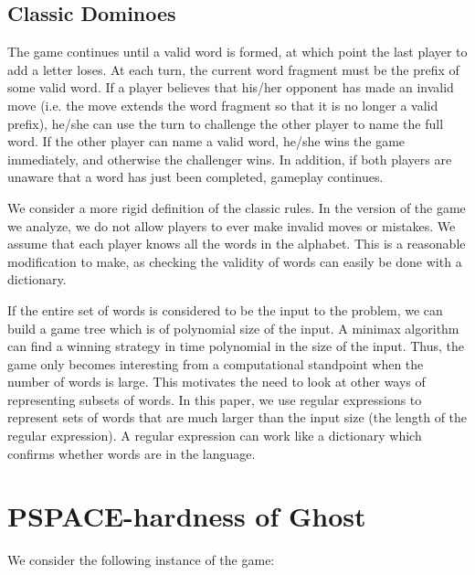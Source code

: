 \documentclass[runningheads,a4paper]{llncs}
\begin{document}
\subsection{Classic Dominoes}

The game continues until a valid word is formed, at which point the last player to add a letter loses. At each turn, the current word fragment must be the prefix of some valid word. If a player believes that his/her opponent has made an invalid move (i.e. the move extends the word fragment so that it is no longer a valid prefix), he/she can use the turn to challenge the other player to name the full word. If the other player can name a valid word, he/she wins the game immediately, and otherwise the challenger wins. In addition, if both players are unaware that a word has just been completed, gameplay continues.

	We consider a more rigid definition of the classic rules. In the version of the game we analyze, we do not allow players to ever make invalid moves or mistakes. We assume that each player knows all the words in the alphabet. This is a reasonable modification to make, as checking the validity of words can easily be done with a dictionary.

	If the entire set of words is considered to be the input to the problem, we can build a game tree which is of polynomial size of the input. A minimax algorithm can find a winning strategy in time polynomial in the size of the input. Thus, the game only becomes interesting from a computational standpoint when the number of words is large. This motivates the need to look at other ways of representing subsets of words. In this paper, we use regular expressions to represent sets of words that are much larger than the input size (the length of the regular expression). A regular expression can work like a dictionary which confirms whether words are in the language.

\section{PSPACE-hardness of Ghost}
\label{PSPACE-hardness of Ghost}We consider the following instance of the game:
\end{document}

